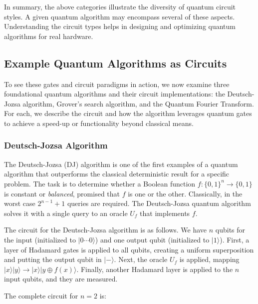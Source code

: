 In summary, the above categories illustrate the diversity of quantum circuit styles. A given quantum algorithm may encompass several of these aspects.\cite{Shor1994} Understanding the circuit types helps in designing and optimizing quantum algorithms for real hardware.\cite{Arute2019supremacy}


\subsection{Example Quantum Algorithms as Circuits}

To see these gates and circuit paradigms in action, we now examine three foundational quantum algorithms and their circuit implementations: the Deutsch-Jozsa algorithm, Grover's search algorithm, and the Quantum Fourier Transform.\cite{NielsenChuang2010} For each, we describe the circuit and how the algorithm leverages quantum gates to achieve a speed-up or functionality beyond classical means.\cite{Preskill2018nisq}

\subsubsection*{Deutsch-Jozsa Algorithm}

The Deutsch-Jozsa (DJ) algorithm is one of the first examples of a quantum algorithm that outperforms the classical deterministic result for a specific problem.\cite{Deutsch1992rapid} The task is to determine whether a Boolean function $f:\{0,1\}^n \to \{0,1\}$ is constant or \emph{balanced}, promised that $f$ is one or the other.\cite{Deutsch1992rapid} Classically, in the worst case $2^{n-1}+1$ queries are required.\cite{Cleve1998dj} The Deutsch-Jozsa quantum algorithm solves it with a single query to an oracle $U_f$ that implements $f$.\cite{Deutsch1992rapid}

The circuit for the Deutsch-Jozsa algorithm is as follows.\cite{NielsenChuang2010} We have $n$ qubits for the input (initialized to $|0\cdots0\rangle$) and one output qubit (initialized to $|1\rangle$). First, a layer of Hadamard gates is applied to all qubits, creating a uniform superposition and putting the output qubit in $|-\rangle$.\cite{Deutsch1992rapid} Next, the oracle $U_f$ is applied, mapping $|x\rangle|y\rangle\!\to\!|x\rangle|y\oplus f(x)\rangle$.\cite{Cleve1998dj} Finally, another Hadamard layer is applied to the $n$ input qubits, and they are measured.\cite{NielsenChuang2010}

The complete circuit for $n=2$ is:

